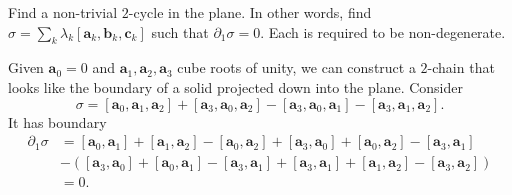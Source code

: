 \documentclass[12 pt, letterpaper]{hmcpset}
\begin{document}
\pagebreak

\begin{problem}[26.]
	Find a non-trivial $2$-cycle in the plane. In other words, find $\sigma = \sum_{k} \lambda_{k} [\mathbf{a}_{k}, \mathbf{b}_{k}, \mathbf{c}_{k}]$ such that $\partial_{1} \sigma = 0$. Each is required to be non-degenerate.
\end{problem}

\begin{solution}
	Given $\mathbf{a}_{0} = 0$ and  $\mathbf{a}_{1}, \mathbf{a}_{2}, \mathbf{a}_{3}$ cube roots of unity, we can construct a $2$-chain that looks like the boundary of a solid projected down into the plane. Consider
	\[
		\sigma = [\mathbf{a}_{0}, \mathbf{a}_{1}, \mathbf{a}_{2}] + [\mathbf{a}_{3}, \mathbf{a}_{0}, \mathbf{a}_{2}] - [\mathbf{a}_{3}, \mathbf{a}_{0}, \mathbf{a}_{1}] - [\mathbf{a}_{3}, \mathbf{a}_{1}, \mathbf{a}_{2}].
	\]
	It has boundary
	\begin{align*}
		\partial_{1} \sigma & = [\mathbf{a}_{0}, \mathbf{a}_{1}] + [\mathbf{a}_{1}, \mathbf{a}_{2}] - [\mathbf{a}_{0}, \mathbf{a}_{2}] + [\mathbf{a}_{3}, \mathbf{a}_{0}] + [\mathbf{a}_{0}, \mathbf{a}_{2}] - [\mathbf{a}_{3}, \mathbf{a}_{1}] \\
				    &- \left ( [\mathbf{a}_{3}, \mathbf{a}_{0}] + [\mathbf{a}_{0}, \mathbf{a}_{1}] - [\mathbf{a}_{3}, \mathbf{a}_{1}] + [\mathbf{a}_{3}, \mathbf{a}_{1}] + [\mathbf{a}_{1}, \mathbf{a}_{2}] - [\mathbf{a}_{3}, \mathbf{a}_{2}] \right ) \\
				    & = 0.
	\end{align*}
\end{solution}
\end{document}

